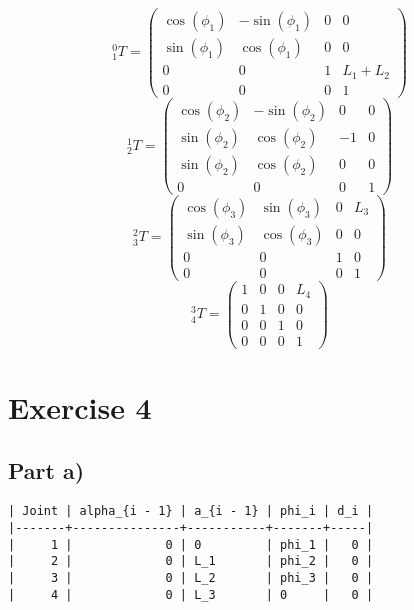 \documentclass[10pt,a4paper]{article}
\begin{document}
\begin{equation*}
  {}_{1}^{0}T = \begin{pmatrix}
    \cos(\phi_{1}) & -\sin(\phi_{1}) & 0 & 0\\
    \sin(\phi_{1}) & \cos(\phi_{1}) & 0 & 0\\
    0 & 0 & 1 & L_{1} + L_{2}\\
    0 & 0 & 0 & 1
  \end{pmatrix}
\end{equation*}
\begin{equation*}
  {}_{2}^{1}T = \begin{pmatrix}
    \cos(\phi_{2}) & -\sin(\phi_{2}) & 0 & 0\\
    \sin(\phi_{2}) & \cos(\phi_{2}) & -1 & 0\\
    \sin(\phi_{2}) & \cos(\phi_{2}) & 0 & 0\\
    0 & 0 & 0 & 1
  \end{pmatrix}
\end{equation*}
\begin{equation*}
  {}_{3}^{2}T = \begin{pmatrix}
    \cos(\phi_{3}) & \sin(\phi_{3}) & 0 & L_{3}\\
    \sin(\phi_{3}) & \cos(\phi_{3}) & 0 & 0\\
    0 & 0 & 1 & 0\\
    0 & 0 & 0 & 1
  \end{pmatrix}
\end{equation*}
\begin{equation*}
  {}_{4}^{3}T = \begin{pmatrix}
    1 & 0 & 0 & L_{4}\\
    0 & 1 & 0 & 0\\
    0 & 0 & 1 & 0\\
    0 & 0 & 0 & 1
  \end{pmatrix}
\end{equation*}

\section*{Exercise 4}

\subsection*{Part a)}

\begin{verbatim}
| Joint | alpha_{i - 1} | a_{i - 1} | phi_i | d_i |
|-------+---------------+-----------+-------+-----|
|     1 |             0 | 0         | phi_1 |   0 |
|     2 |             0 | L_1       | phi_2 |   0 |
|     3 |             0 | L_2       | phi_3 |   0 |
|     4 |             0 | L_3       | 0     |   0 |
\end{verbatim}
\end{document}
